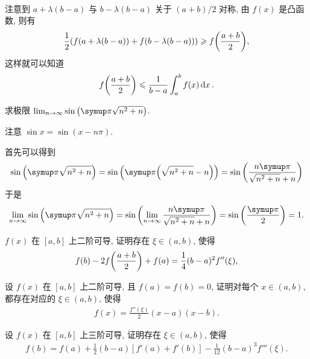 \begin{exercise}[series=exer]
\begin{answer}
\begin{align*}
        \end{align*}
        注意到 $ a + \lambda(b - a) $ 与 $ b - \lambda(b - a) $ 关于 $ (a + b)/2 $ 对称, 由 $ f(x) $ 是凸函数, 则有
        \begin{align*}
            \frac{1}{2}(f(a + \lambda(b - a)) + f(b - \lambda(b - a))) \geqslant f\qty(\frac{a + b}{2}), 
        \end{align*}
        这样就可以知道
        \begin{align*}
            f\qty(\frac{a + b}{2}) \leqslant \frac{1}{b - a} \int_{a}^{b} f(x) \dd{x}.
        \end{align*}
    \end{answer}
    \item 求极限 $ \limit{n}{\infty} \sin\qty(\pi \sqrt{n^{2} + n}) $.
    \begin{hint}
        注意 $ \sin x = \sin (x - n \pi) $.
    \end{hint}
    \begin{answer}
        首先可以得到
        \begin{align*}
            \sin\qty(\pi \sqrt{n^{2} + n}) = \sin\qty(\pi \qty(\sqrt{n^{2} + n} - n)) = \sin\qty(\frac{n\pi}{\sqrt{n^{2} + n} + n})
        \end{align*}
        于是
        \begin{align*}
            \limit{n}{\infty}\sin\qty(\pi \sqrt{n^{2} + n}) = \sin\qty(\limit{n}{\infty}\frac{n\pi}{\sqrt{n^{2} + n} + n}) = \sin\qty(\frac{\pi}{2}) = 1.
        \end{align*}
    \end{answer}
    \item $ f(x) $ 在 $ [a, b] $ 上二阶可导, 证明存在 $ \xi \in (a, b) $, 使得
    \begin{align*}
        f(b) - 2f\qty(\frac{a + b}{2}) + f(a) = \frac{1}{4} (b - a)^{2} f''(\xi),
    \end{align*}
    \item 设 $ f(x) $ 在 $ [a, b] $ 上二阶可导, 且 $ f(a) = f(b)  = 0 $, 证明对每个 $ x \in (a, b) $, 都存在对应的 $ \xi \in (a, b) $, 使得
    \begin{align*}
        f(x) = \frac{f''(\xi)}{2} (x - a) (x - b).
    \end{align*}
    \item 设 $ f(x) $ 在 $ [a, b] $ 上三阶可导, 证明存在 $ \xi \in (a, b) $, 使得
    \begin{align*}
        f(b) = f(a) + \frac{1}{2} (b - a) [f'(a) + f'(b)] - \frac{1}{12} (b - a)^{3} f'''(\xi).
    \end{align*}

\end{exercise}
